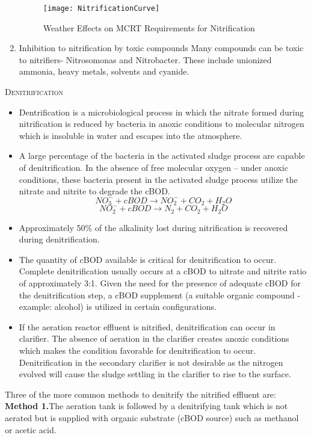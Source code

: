 \begin{enumerate}
		\begin{figure}
				\begin{center}
					\texttt{[image: NitrificationCurve]}
								\caption{Weather Effects on MCRT Requirements for Nitrification}
				\end{center}
		\end{figure}
				\item Inhibition to nitrification by toxic compounds
				\noindent Many compounds can be toxic to nitrifiers- Nitrosomonas and Nitrobacter.  These include unionized ammonia, heavy metals, solvents and cyanide.  
			\end{enumerate}
			\newpage
\noindent\textsc{{Denitrification}}%
			\begin{itemize}
				\item Dentrification is a microbiological process in which the nitrate formed during nitrification is reduced by bacteria in anoxic conditions to molecular nitrogen which is insoluble in water and escapes into the atmosphere.
				\item A large percentage of the bacteria in the activated sludge process are capable of denitrification. In the absence of free molecular oxygen – under anoxic conditions, these bacteria present in the activated sludge process utilize the nitrate and nitrite to degrade the cBOD.  
				$$NO_3^- + cBOD   \rightarrow NO_2^- + CO_2 + H_2O$$
				$$NO_2^- + cBOD   \rightarrow N_2 + CO_2 + H_2O$$
				\item Approximately 50\% of the alkalinity lost during nitrification is recovered during denitrification.  
				\item The quantity of cBOD available is critical for denitrification to occur.  Complete denitrification usually occurs at a cBOD to nitrate and nitrite ratio of approximately 3:1. Given the need for the presence of adequate cBOD for the denitrification step, a cBOD supplement (a suitable organic compound - example: alcohol) is utilized in certain configurations.  
				\item If the aeration reactor effluent is nitrified, denitrification can occur in clarifier.  The absence of aeration in the clarifier creates anoxic conditions which makes the condition favorable for denitrification to occur.  Denitrification in the secondary clarifier is not desirable as the nitrogen evolved will cause the sludge settling in the clarifier to rise to the surface.
			\end{itemize}
			\noindent Three of the more common methods to denitrify the nitrified effluent are:\\
			\vspace{0.3cm}
\noindent \textbf{Method 1.}The aeration tank is followed by a denitrifying tank which is not aerated but is supplied with organic substrate (cBOD source) such as methanol or acetic acid.  
				
